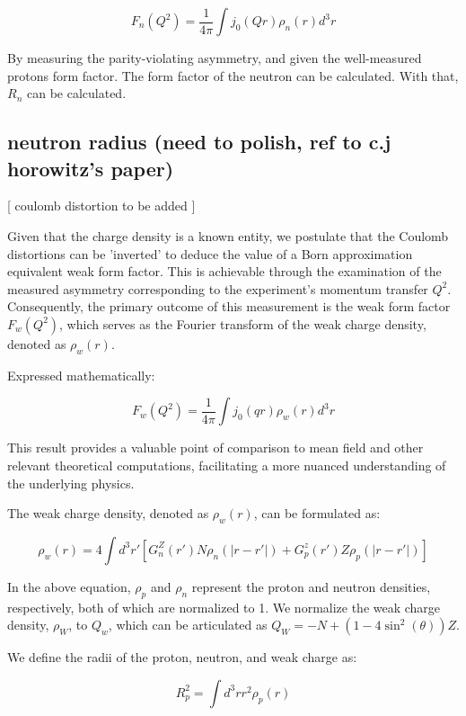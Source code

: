 \begin{equation}
    F_n(Q^2) = \frac{1}{4\pi}\int j_0(Qr)\rho_n(r)d^3r
\end{equation}


By measuring the parity-violating asymmetry, and given the well-measured protons form factor. The form factor of the neutron can be calculated. With that, $R_n$ can be calculated. 

\subsection{neutron radius (need to polish, ref to c.j horowitz's paper)}

[ coulomb distortion to be added ]

Given that the charge density is a known entity, we postulate that the Coulomb distortions can be 'inverted' to deduce the value of a Born approximation equivalent weak form factor. This is achievable through the examination of the measured asymmetry corresponding to the experiment's momentum transfer $Q^2$. Consequently, the primary outcome of this measurement is the weak form factor $F_w(Q^2)$, which serves as the Fourier transform of the weak charge density, denoted as $\rho_w(r)$.

Expressed mathematically:

\begin{equation}
F_w(Q^2) = \frac{1}{4\pi}\int j_0(qr)\rho_w(r)d^3r
\end{equation}

This result provides a valuable point of comparison to mean field and other relevant theoretical computations, facilitating a more nuanced understanding of the underlying physics.

The weak charge density, denoted as $\rho_w(r)$, can be formulated as:

\begin{equation}\label{eq:weak_charge_density_ch2_1}
\rho_w(r) = 4\int d^3r'[G_n^Z(r')N\rho_n(|r-r'|) + G^z_p(r')Z\rho_p(|r-r'|)]
\end{equation}

In the above equation, $\rho_p$ and $\rho_n$ represent the proton and neutron densities, respectively, both of which are normalized to 1. We normalize the weak charge density, $\rho_W$, to $Q_w$, which can be articulated as $Q_W = -N + (1-4\sin^2(\theta))Z$.

We define the radii of the proton, neutron, and weak charge as:

\begin{equation}
R^2_p = \int d^3rr^2\rho_p(r)
\end{equation}

